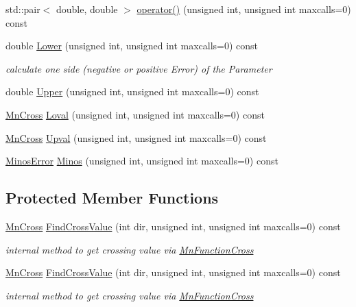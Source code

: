 \begin{DoxyCompactItemize}
\item 
std\+::pair$<$ double, double $>$ \mbox{\hyperlink{classROOT_1_1Minuit2_1_1MnMinos_a82c85ed2e8212675339ffcc2a5bb61cb}{operator()}} (unsigned int, unsigned int maxcalls=0) const
\item 
double \mbox{\hyperlink{classROOT_1_1Minuit2_1_1MnMinos_a0e6c6ab67bdd7b3461d900f64b4908ba}{Lower}} (unsigned int, unsigned int maxcalls=0) const
\begin{DoxyCompactList}\small\item\em calculate one side (negative or positive Error) of the Parameter \end{DoxyCompactList}\item 
double \mbox{\hyperlink{classROOT_1_1Minuit2_1_1MnMinos_a387b76e3135998c519db7e6ae4cc3d90}{Upper}} (unsigned int, unsigned int maxcalls=0) const
\item 
\mbox{\hyperlink{classROOT_1_1Minuit2_1_1MnCross}{Mn\+Cross}} \mbox{\hyperlink{classROOT_1_1Minuit2_1_1MnMinos_a708381f90e4bd9118dec60726a1bdf73}{Loval}} (unsigned int, unsigned int maxcalls=0) const
\item 
\mbox{\hyperlink{classROOT_1_1Minuit2_1_1MnCross}{Mn\+Cross}} \mbox{\hyperlink{classROOT_1_1Minuit2_1_1MnMinos_a6fb073e7f84cb2d038714e362eda732a}{Upval}} (unsigned int, unsigned int maxcalls=0) const
\item 
\mbox{\hyperlink{classROOT_1_1Minuit2_1_1MinosError}{Minos\+Error}} \mbox{\hyperlink{classROOT_1_1Minuit2_1_1MnMinos_aeb1fe39f5851b5af050191d812d21723}{Minos}} (unsigned int, unsigned int maxcalls=0) const
\end{DoxyCompactItemize}
\subsection*{Protected Member Functions}
\begin{DoxyCompactItemize}
\item 
\mbox{\hyperlink{classROOT_1_1Minuit2_1_1MnCross}{Mn\+Cross}} \mbox{\hyperlink{classROOT_1_1Minuit2_1_1MnMinos_a4b8df109769bd0bee2127da68615bb11}{Find\+Cross\+Value}} (int dir, unsigned int, unsigned int maxcalls=0) const
\begin{DoxyCompactList}\small\item\em internal method to get crossing value via \mbox{\hyperlink{classROOT_1_1Minuit2_1_1MnFunctionCross}{Mn\+Function\+Cross}} \end{DoxyCompactList}\item 
\mbox{\hyperlink{classROOT_1_1Minuit2_1_1MnCross}{Mn\+Cross}} \mbox{\hyperlink{classROOT_1_1Minuit2_1_1MnMinos_a4b8df109769bd0bee2127da68615bb11}{Find\+Cross\+Value}} (int dir, unsigned int, unsigned int maxcalls=0) const
\begin{DoxyCompactList}\small\item\em internal method to get crossing value via \mbox{\hyperlink{classROOT_1_1Minuit2_1_1MnFunctionCross}{Mn\+Function\+Cross}} \end{DoxyCompactList}\end{DoxyCompactItemize}


